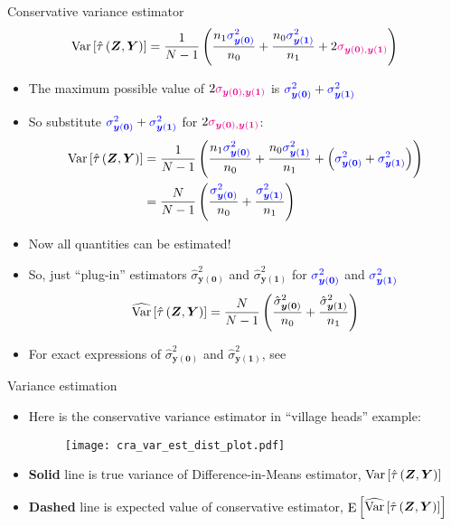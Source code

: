 \documentclass[table, xcolor = {dvipsnames}, 9pt]{beamer}
\theoremstyle{plain}
\newcommand{\bh}[1]{{\color{blue}{#1}}}
\newcommand{\mh}[1]{{\color{magenta}{#1}}}
\DeclareMathOperator{\E}{\rm{E}}
\DeclareMathOperator{\Var}{\rm{Var}}
\begin{document}
\begin{frame}{Conservative variance estimator}
\begin{equation*}
\Var\left[\hat{\tau}\left(\bm{Z}, \bm{Y}\right)\right] = \frac{1}{N - 1}\left(\frac{n_1 \bh{\sigma^2_{\bm{y}(\bm{0})}}}{n_0} + \frac{n_0 \bh{\sigma^2_{\bm{y}(\bm{1})}}}{n_1} + 2\mh{\sigma_{\bm{y}(\bm{0}), \bm{y}(\bm{1})}}\right)
\end{equation*} \pause
\begin{itemize}
\item The maximum possible value of $2\mh{\sigma_{\bm{y}(\bm{0}), \bm{y}(\bm{1})}}$ is $\bh{\sigma^2_{\bm{y}(\bm{0})}} + \bh{\sigma^2_{\bm{y}(\bm{1})}}$
\item So substitute $\bh{\sigma^2_{\bm{y}(\bm{0})}} + \bh{\sigma^2_{\bm{y}(\bm{1})}}$ for $2\mh{\sigma_{\bm{y}(\bm{0}), \bm{y}(\bm{1})}}$: \pause
\begin{align*}
\Var\left[\hat{\tau}\left(\bm{Z}, \bm{Y}\right)\right] & = \frac{1}{N - 1}\left(\frac{n_1 \bh{\sigma^2_{\bm{y}(\bm{0})}}}{n_0} + \frac{n_0 \bh{\sigma^2_{\bm{y}(\bm{1})}}}{n_1} + \left(\bh{\sigma^2_{\bm{y}(\bm{0})}} + \bh{\sigma^2_{\bm{y}(\bm{1})}}\right)\right) \\
& = \frac{N}{N - 1}\left(\frac{\bh{\sigma^2_{\bm{y}(\bm{0})}}}{n_0} + \frac{\bh{\sigma^2_{\bm{y}(\bm{1})}}}{n_1}\right)
\end{align*} \pause
\item Now all quantities can be estimated! \pause
\item So, just ``plug-in'' estimators $\hat{\sigma}^2_{\bm{y}(\bm{0})}$ and $\hat{\sigma}^2_{\bm{y}(\bm{1})}$ for $\bh{\sigma^2_{\bm{y}(\bm{0})}}$ and $\bh{\sigma^2_{\bm{y}(\bm{1})}}$
\begin{equation}
\widehat{\Var}\left[\hat{\tau}\left(\bm{Z}, \bm{Y}\right)\right] = \frac{N}{N - 1}\left(\frac{\hat{\sigma}^2_{\bm{y}(\bm{0})}}{n_0} + \frac{\hat{\sigma}^2_{\bm{y}(\bm{1})}}{n_1} \right)
\end{equation}
\item For exact expressions of $\hat{\sigma}^2_{\bm{y}(\bm{0})}$ and $\hat{\sigma}^2_{\bm{y}(\bm{1})}$, see \hyperlink{Variance estimators}{}
\end{itemize}
\end{frame}
\begin{frame}{Variance estimation}
\vfill
\begin{itemize} \vfill
\item Here is the conservative variance estimator in ``village heads'' example: \vfill
\begin{figure}[H]
\texttt{[image: cra\_var\_est\_dist\_plot.pdf]}
\end{figure} \vfill
\item[] \small \textbf{Solid} line is true variance of Difference-in-Means estimator, $\Var\left[\hat{\tau}\left(\bm{Z}, \bm{Y}\right)\right]$  \vfill
\item[] \textbf{Dashed} line is expected value of conservative estimator, $\E\left[\widehat{\Var}\left[\hat{\tau}\left(\bm{Z}, \bm{Y}\right)\right]\right]$ \normalsize \vfill
\end{itemize} \vfill
\end{frame}
\end{document}
